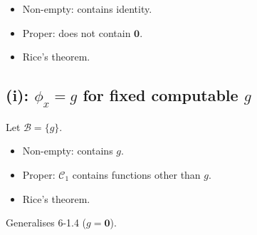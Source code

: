 \documentclass[fleqn]{article}
\begin{document}
\begin{itemize}
\item Non-empty: contains identity.
\item Proper: does not contain $\mathbf{0}$.
\item Rice's theorem.
\end{itemize}

\subsection*{(i): $\phi_x = g$ for fixed computable $g$}

Let $\mathscr{B} = \{g\}$.

\begin{itemize}
\item Non-empty: contains $g$.
\item Proper: $\mathscr{C}_1$ contains functions other than $g$.
\item Rice's theorem.
\end{itemize}

Generalises 6-1.4 ($g = \mathbf{0}$).
\end{document}
